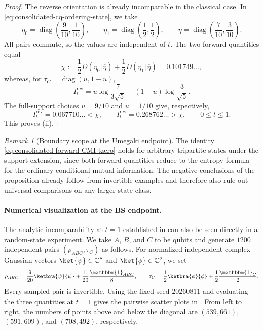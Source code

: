 \documentclass[11pt]{article}
\theoremstyle{remark}
\newtheorem{remark}[remark]{Remark}
\DeclareMathOperator{\rev}{rev}
\newcommand{\1}{\mathbbm{1}}
\begin{document}
\begin{proof}
The reverse orientation is already incomparable in the classical
case.  In \eqref{eq:consolidated-cq-ordering-state}, we take
\begin{equation}
 \eta_0=\operatorname{diag}\!\left(\frac9{10},\frac1{10}\right),
 \qquad
 \eta_1=\operatorname{diag}\!\left(\frac12,\frac12\right),
 \qquad
 \overline\eta=\operatorname{diag}\!\left(\frac7{10},\frac3{10}\right).
\end{equation}
All pairs commute, so the values are independent of $t$.  The two
forward quantities equal
\begin{equation}
 \chi:=\frac12D(\eta_0\Vert\overline\eta)
       +\frac12D(\eta_1\Vert\overline\eta)
 =0.101749\ldots,
\end{equation}
whereas, for $\tau_C=\operatorname{diag}(u,1-u)$,
\begin{equation}
 I_t^{\rev}
 =u\log\frac7{3\sqrt5}+(1-u)\log\frac3{\sqrt5}.
 \label{eq:consolidated-classical-reverse-values}
\end{equation}
The full-support choices $u=9/10$ and $u=1/10$ give, respectively,
\begin{equation}
 I_t^{\rev}=0.067710\ldots<\chi,
 \qquad
 I_t^{\rev}=0.268762\ldots>\chi,
 \qquad 0\leq t\leq1.
\end{equation}
This proves (ii).
\end{proof}

\begin{remark}[Boundary scope at the Umegaki endpoint]
The identity \eqref{eq:consolidated-forward-CMI-tzero} holds for
arbitrary tripartite states under the support extension, since both
forward quantities reduce to the entropy formula for the ordinary
conditional mutual information.  The negative conclusions of the
proposition already follow from invertible examples and therefore
also rule out universal comparisons on any larger state class.
\end{remark}

\paragraph{Numerical visualization at the BS endpoint.}
The analytic incomparability at $t=1$ established in
 can also be seen directly
in a random-state experiment.  We take $A$, $B$, and $C$ to be qubits
and generate $1200$ independent pairs $(\rho_{ABC},\tau_C)$ as
follows.  For normalized independent complex Gaussian vectors
$\ket{\psi}\in\mathbb C^8$ and $\ket{\phi}\in\mathbb C^2$, we set
\begin{equation}
 \rho_{ABC}=\frac9{20}\ketbra{\psi}{\psi}
             +\frac{11}{20}\frac{\1_{ABC}}8,
 \qquad
 \tau_C=\frac12\ketbra{\phi}{\phi}
             +\frac12\frac{\1_C}2.
 \label{eq:consolidated-BS-scatter-ensemble}
\end{equation}
Every sampled pair is invertible.  Using the fixed seed $20260811$ and
evaluating the three quantities at $t=1$ gives the pairwise scatter
plots in .  From left to right,
the numbers of points above and below the diagonal are
$(539,661)$, $(591,609)$, and $(708,492)$, respectively.
\end{document}
